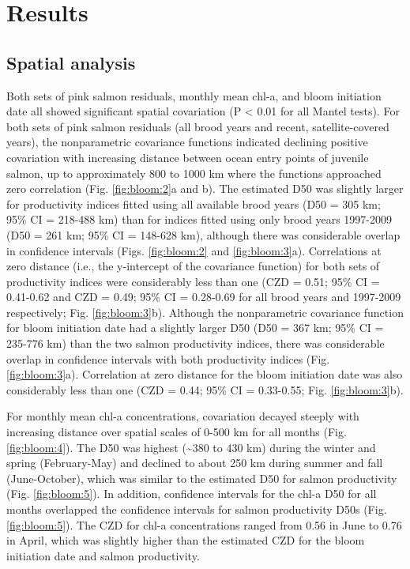 \section{Results}

\subsection{Spatial analysis}

Both sets of pink salmon residuals, monthly mean chl-a, and bloom initiation
date all showed significant spatial covariation (P \textless{} 0.01 for all
Mantel tests). For both sets of pink salmon residuals (all brood years and
recent, satellite-covered years), the nonparametric covariance functions
indicated declining positive covariation with increasing distance between ocean
entry points of juvenile salmon, up to approximately 800 to 1000 km where the
functions approached zero correlation (Fig. \ref{fig:bloom:2}a and b). The
estimated D50 was slightly larger for productivity indices fitted using all
available brood years (D50 = 305 km; 95\% CI = 218-488 km) than for indices
fitted using only brood years 1997-2009 (D50 = 261 km; 95\% CI = 148-628 km),
although there was considerable overlap in confidence intervals (Figs.
\ref{fig:bloom:2} and \ref{fig:bloom:3}a). Correlations at zero distance (i.e.,
the y-intercept of the covariance function) for both sets of productivity
indices were considerably less than one (CZD = 0.51; 95\% CI = 0.41-0.62 and CZD
= 0.49; 95\% CI = 0.28-0.69 for all brood years and 1997-2009 respectively; Fig.
\ref{fig:bloom:3}b). Although the nonparametric covariance function for bloom
initiation date had a slightly larger D50 (D50 = 367 km; 95\% CI = 235-776 km)
than the two salmon productivity indices, there was considerable overlap in
confidence intervals with both productivity indices (Fig. \ref{fig:bloom:3}a).
Correlation at zero distance for the bloom initiation date was also considerably
less than one (CZD = 0.44; 95\% CI = 0.33-0.55; Fig. \ref{fig:bloom:3}b).

For monthly mean chl-a concentrations, covariation decayed steeply with
increasing distance over spatial scales of 0-500 km for all months (Fig.
\ref{fig:bloom:4}).  The D50 was highest (\textasciitilde{}380 to 430 km) during
the winter and spring (February-May) and declined to about 250 km during summer
and fall (June-October), which was similar to the estimated D50 for salmon
productivity (Fig. \ref{fig:bloom:5}). In addition, confidence intervals for the
chl-a D50 for all months overlapped the confidence intervals for salmon
productivity D50s (Fig.  \ref{fig:bloom:5}). The CZD for chl-a concentrations
ranged from 0.56 in June to 0.76 in April, which was slightly higher than the
estimated CZD for the bloom initiation date and salmon productivity.


